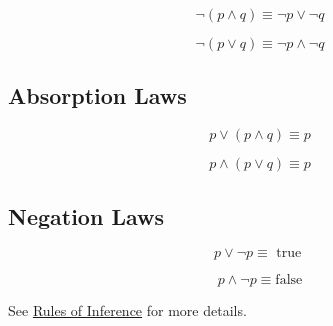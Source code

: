 \documentclass[11pt]{article}
\begin{document}
\[
\neg( p \land q) \equiv \neg p \lor \neg q
\]

\[
\neg(p \lor q) \equiv \neg p \land \neg q
\]
\subsection{Absorption Laws}
\label{sec:org9719a78}

\[
p \lor (p \land q) \equiv p
\]

\[
p \land (p \lor q) \equiv p
\]
\subsection{Negation Laws}
\label{sec:org2da39c2}

\[
p \lor \neg p \equiv \text{ true }
\]

\[
p \land \neg p \equiv \text{false}
\]




See \href{20260613123317-rules_of_inference.org}{Rules of Inference} for more details.
\end{document}
